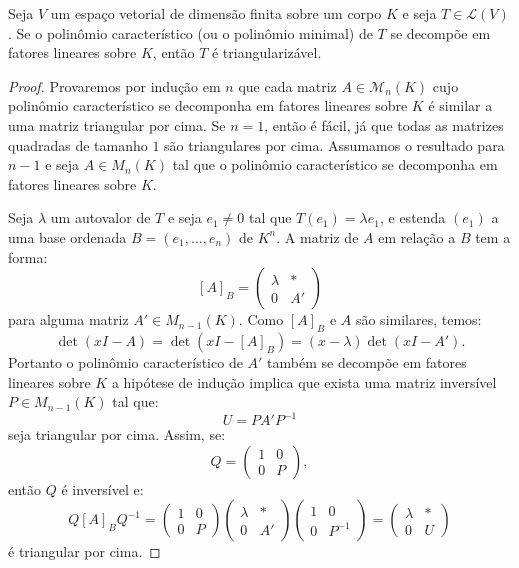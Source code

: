 \documentclass[11pt,twoside,a4paper]{book}
\begin{document}
\begin{teorema}
Seja $V$ um espaço vetorial de dimensão finita sobre um corpo $K$ e seja $T\in\mathcal{L}(V)$. Se o polinômio característico (ou o polinômio minimal) de $T$ se decompõe em fatores lineares sobre $K$, então $T$ é triangularizável.
\end{teorema}
\begin{proof}
Provaremos por indução em $n$ que cada matriz $A\in\mathcal{M}_n(K)$
cujo polinômio característico se decomponha em fatores lineares sobre $K$ é similar
a uma matriz triangular por cima. Se $n=1$, então é fácil, já que todas as matrizes quadradas de tamanho $1$ são triangulares por cima. Assumamos o resultado para $n-1$ e seja $A\in M_n(K)$ tal que o polinômio característico se decomponha em fatores lineares sobre $K$.

\medskip
\noindent
Seja $\lambda$ um autovalor de $T$ e seja $e_1\neq 0$ tal que $T(e_1)=\lambda e_1$, e estenda $(e_1)$ a uma base ordenada $B=(e_1,\dots,e_n)$ de $K^n$. A matriz de $A$ em relação a $B$ tem a forma:
\[
[A]_B=\begin{pmatrix}
\lambda&*\\0&A'
\end{pmatrix}
\]
para alguma matriz $A'\in M_{n-1}(K)$. Como $[A]_B$ e $A$ são similares, temos:
\[
\det(xI-A)=\det(xI-[A]_B)=(x-\lambda)\det(xI-A').
\]
Portanto o polinômio característico de $A'$ também se decompõe em fatores lineares sobre $K$ a hipótese de indução implica que exista uma matriz inversível $P\in M_{n-1}(K)$ tal que:
\[
U=PA'P^{-1}
\]
seja triangular por cima. Assim, se:
\[
Q=\begin{pmatrix}
1&0\\0&P
\end{pmatrix},
\]
então $Q$ é inversível e:
\[
Q[A]_BQ^{-1}=\begin{pmatrix}
1&0\\0&P
\end{pmatrix}\begin{pmatrix}
\lambda&*\\0&A'
\end{pmatrix}\begin{pmatrix}
1&0\\0&P^{-1}
\end{pmatrix}=
\begin{pmatrix}
\lambda&*\\0&U
\end{pmatrix}
\]
é triangular por cima.
\end{proof}
\end{document}
